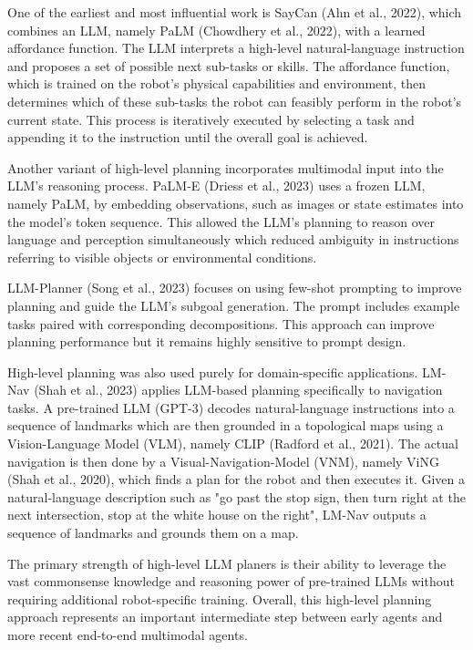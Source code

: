 \documentclass[11pt]{article}
\begin{document}
One of the earliest and most influential work is SayCan (Ahn et al., 2022), which combines an LLM, namely PaLM (Chowdhery et al., 2022), with a learned affordance function. The LLM interprets a high-level natural-language instruction and proposes a set of possible next sub-tasks or skills. The affordance function, which is trained on the robot's physical capabilities and environment, then determines which of these sub-tasks the robot can feasibly perform in the robot's current state. This process is iteratively executed by selecting a task and appending it to the instruction until the overall goal is achieved.

Another variant of high-level planning incorporates multimodal input into the LLM's reasoning process. PaLM-E (Driess et al., 2023) uses a frozen LLM, namely PaLM, by embedding observations, such as images or state estimates into the model's token sequence. This allowed the LLM's planning to reason over language and perception simultaneously which reduced ambiguity in instructions referring to visible objects or environmental conditions.

LLM-Planner (Song et al., 2023) focuses on using few-shot prompting to improve planning and guide the LLM's subgoal generation. The prompt includes example tasks paired with corresponding decompositions. This approach can improve planning performance but it remains highly sensitive to prompt design.

High-level planning was also used purely for domain-specific applications. LM-Nav (Shah et al., 2023) applies LLM-based planning specifically to navigation tasks. A pre-trained LLM (GPT-3) decodes natural-language instructions into a sequence of landmarks which are then grounded in a topological maps using a Vision-Language Model (VLM), namely CLIP (Radford et al., 2021). The actual navigation is then done by a Visual-Navigation-Model (VNM), namely ViNG (Shah et al., 2020), which finds a plan for the robot and then executes it. Given a natural-language description such as "go past the stop sign, then turn right at the next intersection, stop at the white house on the right", LM-Nav outputs a sequence of landmarks and grounds them on a map.
\hfill \break

The primary strength of high-level LLM planers is their ability to leverage the vast commonsense knowledge and reasoning power of pre-trained LLMs without requiring additional robot-specific training.
Overall, this high-level planning approach represents an important intermediate step between early agents and more recent end-to-end multimodal agents. 
\end{document}

